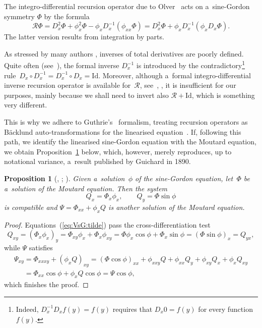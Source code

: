 \documentclass[pdftex]{sigma}
\def\eqref#1{{\rm(\ref{#1})}}
\def\RO{{\mathcal R}}
\numberwithin{equation}{section}
\newtheorem{Proposition}[Theorem]{Proposition}
\theoremstyle{definition}
\begin{document}
The integro-differential recursion operator due to
Olver~\cite[equation~(21)]{PJO-1977}
acts on a~sine-Gordon symmetry $\Phi$ by the formula
\begin{equation}
\label{eq:sG:RO:Olver}
\RO\Phi = D_x^2 \Phi + \phi_x^2 \Phi - \phi_x D_x^{-1} (\phi_{xx} \Phi) = D_x^2 \Phi + \phi_x D_x^{-1} (\phi_x D_x \Phi).
\end{equation}
The latter version results from integration by parts.


As stressed by many authors
\cite{GAG-1994,PJO-1977,S-W-2001a,JMV-1991},
inverses of total derivatives are poorly defined.
Quite often (see~\cite{L-H-L-2021,S-W-2001a}),
the formal inverse $D_x^{-1}$ is introduced
by the contradictory\footnote{Indeed, $D_x^{-1} D_x f(y) = f(y)$
requires that $D_x 0 = f(y)$ for every function $f(y)$.\label{foo:Dinv}}
rule~${D_x \circ D_x^{-1} = D_x^{-1} \circ D_x = \mathrm{Id}}$.
Moreover, although a~formal integro-differential inverse recursion operator
is available for~$\RO$, see~\cite[Section~3]{Ai-1983}, \cite{K-K-2002,L-C-1993}, it is insufficient for our purposes,
mainly because we shall need to invert also $\RO + \mathrm{Id}$,
which is something very different.

This is why we adhere to Guthrie's~\cite{GAG-1994} formalism,
treating recursion operators as B\"acklund auto-transformations
for the linearised equation~\cite{H-Kh-P-2016,MM-alro,MM-rzcr,CJP-1991}.
If, following this path, we identify the linearised sine-Gordon equation with
the Moutard equation, we obtain Proposition~\ref{prop:sG:RO:Guthrie} below,
which, however, merely reproduces, up to notational variance, a~result published by Guichard in 1890.

\begin{Proposition}[{\cite[equations~(3) and (4)]{CG-1890a},
\cite[Section~V]{CG-1890a}; \cite[Example~4.4]{MM-alro}}]
\label{prop:sG:RO:Guthrie}
 Given a~solution~$\phi$ of the sine-Gordon equation,
let~$\Phi$ be a~solution of the Moutard equation.
Then the system
\begin{equation}
\label{eq:VsG:tilde}
Q_x = \Phi_x \phi_x,
\qquad
Q_y = \Phi \sin \phi
\end{equation}
is compatible and
$
\Psi = \Phi_{xx} + \phi_x Q
$
is another solution of the
Moutard equation.
\end{Proposition}



\begin{proof}
Equations~\eqref{eq:VsG:tilde} pass the cross-differentiation test
\[
Q_{xy} = (\Phi_x \phi_x)_y
 = \Phi_{xy} \phi_x + \Phi_x \phi_{xy}
 = \Phi \phi_x \cos\phi + \Phi_x \sin\phi
 = (\Phi \sin \phi)_x
 = Q_{yx},
\]
while $\Psi$ satisfies
\begin{gather*}
\Psi_{xy} = \Phi_{xxxy} + (\phi_x Q)_{xy}
 = (\Phi \cos\phi)_{xx}
 + \phi_{xxy} Q + \phi_{xx} Q_y + \phi_{xy} Q_x + \phi_x Q_{xy}
\\
\phantom{\Psi_{xy}}{}
 = \Phi_{xx} \cos\phi + \phi_x Q \cos\phi = \Psi \cos\phi,
\end{gather*}
which finishes the proof.
\end{proof}
\end{document}
